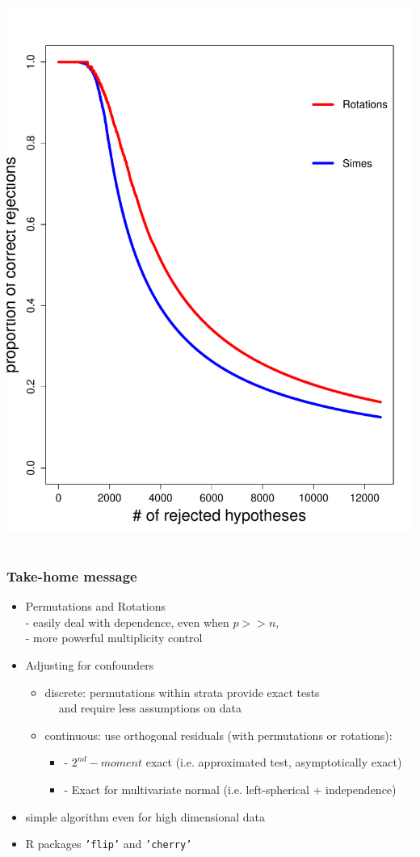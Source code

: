 \documentclass[xcolor={pdftex,dvipsnames,table}]{beamer}
\newcommand{\bi}{\begin {itemize}}
\newcommand{\ei}{\end{itemize}}
\begin{document}
\begin{frame}
\begin{columns}
\includegraphics[scale=.25]{figures_perm_covariates/ALL_proportions}


\end{columns}



\end{frame}
\begin{frame}
\frametitle{Take-home message}

\bi
\item Permutations and Rotations \\
- easily deal with dependence, even when $p>>n$,\\
- more powerful multiplicity control\\
\pause
\item Adjusting for confounders
\pause
\bi
\item[]\textcolor{myblue}{discrete:} permutations within strata provide exact tests\\
\pause
$\ \ \ \ $ and require less assumptions on data
\pause
\item[] \textcolor{myblue}{continuous:} use orthogonal residuals (with permutations or rotations):
\bi 
\item[-] $2^{nd}-moment$ exact (i.e. approximated test, asymptotically exact)
\item[-] Exact for multivariate normal (i.e. left-spherical + independence)
\ei
\ei

\item simple algorithm even for high dimensional data
\item \textcolor{redUnipd}{R packages} {\tt 'flip'} and {\tt 'cherry'}
\ei

\end{frame}
\end{document}
